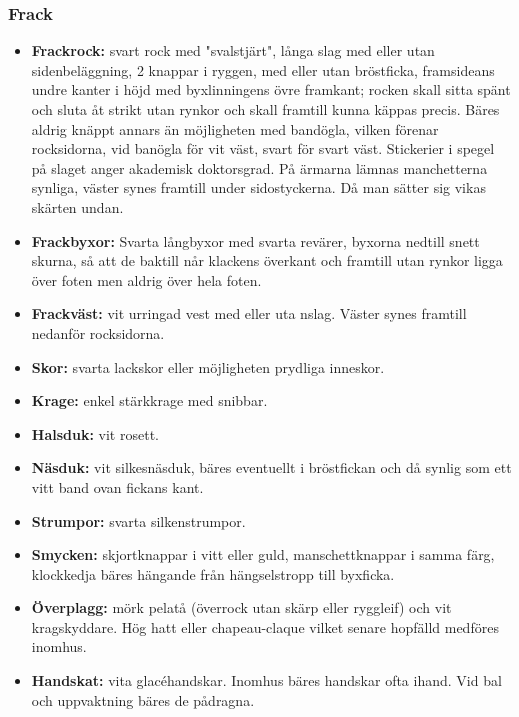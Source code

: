     \subsubsection{\textbf{Frack}}
    \begin{itemize}
    
    \item[]\textbf{Frackrock:} svart rock med "svalstjärt", långa slag med eller utan sidenbeläggning, 2 knappar i ryggen, med eller utan bröstficka, framsideans undre kanter i höjd med byxlinningens övre framkant; rocken skall sitta spänt och sluta åt strikt utan rynkor och skall framtill kunna käppas precis. Bäres aldrig knäppt annars än möjligheten med bandögla, vilken förenar rocksidorna, vid banögla för vit väst, svart för svart väst. Stickerier i spegel på slaget anger akademisk doktorsgrad. På ärmarna lämnas manchetterna synliga, väster synes framtill under sidostyckerna. Då man sätter sig vikas skärten undan.

    \item[]\textbf{Frackbyxor:} Svarta långbyxor med svarta revärer, byxorna nedtill snett skurna, så att de baktill når klackens överkant och framtill utan rynkor ligga över foten men aldrig över hela foten.

    \item[]\textbf{Frackväst:} vit urringad vest med eller uta nslag. Väster synes framtill nedanför rocksidorna.

    \item[]\textbf{Skor:} svarta lackskor eller möjligheten prydliga inneskor.

    \item[]\textbf{Krage:} enkel stärkkrage med snibbar.

    \item[]\textbf{Halsduk:} vit rosett.

    \item[]\textbf{Näsduk:} vit silkesnäsduk, bäres eventuellt i bröstfickan och då synlig som ett vitt band ovan fickans kant.

    \item[]\textbf{Strumpor:} svarta silkenstrumpor.

    \item[]\textbf{Smycken:} skjortknappar i vitt eller guld, manschettknappar i samma färg, klockkedja bäres hängande från hängselstropp till byxficka.

    \item[]\textbf{Överplagg:} mörk pelatå (överrock utan skärp eller ryggleif) och vit kragskyddare. Hög hatt eller chapeau-claque vilket senare hopfälld medföres inomhus.

    \item[]\textbf{Handskat:} vita glacéhandskar. Inomhus bäres handskar ofta ihand. Vid bal och uppvaktning bäres de pådragna.

    \end{itemize}

